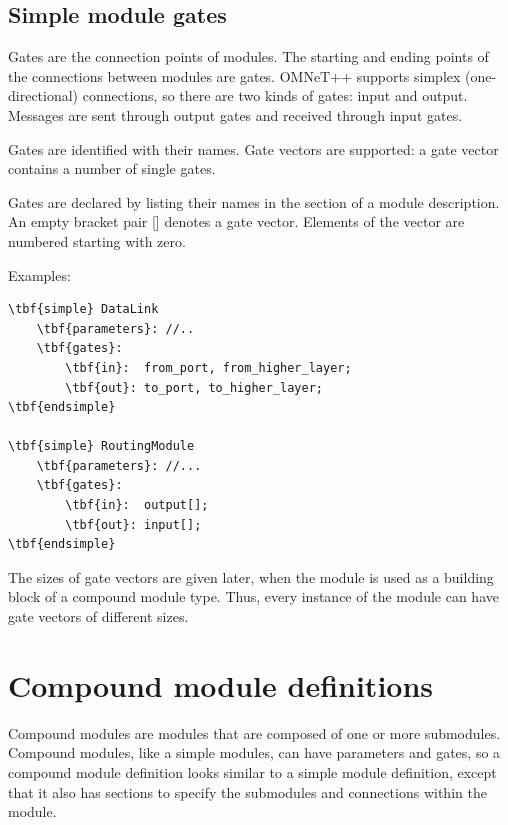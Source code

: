 \subsection{Simple module gates}
\label{sec:ch-ned-lang:simple-module-gates}


Gates are the connection points of modules. The starting and
ending points of the connections between modules are gates. OMNeT++
supports simplex (one-directional) connections, so there are
two kinds of gates: input and output. Messages are sent through
output gates and received through input gates.

Gates are identified with their names. Gate vectors are supported:
a gate vector contains a number of single gates.

Gates are declared by listing their names in the
 section of a module description. An
empty bracket pair [] denotes a gate vector.
Elements of the vector are numbered starting with zero.

Examples:

\begin{Verbatim}[commandchars=\\\{\}]
\tbf{simple} DataLink
    \tbf{parameters}: //..
    \tbf{gates}:
        \tbf{in}:  from_port, from_higher_layer;
        \tbf{out}: to_port, to_higher_layer;
\tbf{endsimple}

\tbf{simple} RoutingModule
    \tbf{parameters}: //...
    \tbf{gates}:
        \tbf{in}:  output[];
        \tbf{out}: input[];
\tbf{endsimple}
\end{Verbatim}

The sizes of gate vectors are given later, when the module is used as
a building block of a compound module type. Thus, every instance of
the module can have gate vectors of different sizes.





\section{Compound module definitions}


Compound modules are modules that are composed of one or more
submodules. Compound modules, like a
simple modules, can have parameters and
gates, so a compound module
definition looks similar to a
simple module definition, except that it also has
sections to specify the submodules and connections within the module.



